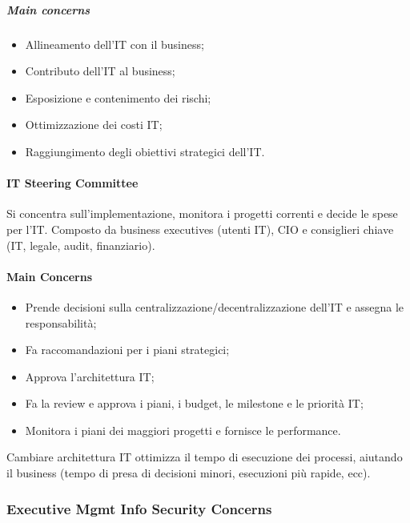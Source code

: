 \subparagraph*{Main concerns}

\begin{itemize}
\item Allineamento dell'IT con il business;
\item Contributo dell'IT al business;
\item Esposizione e contenimento dei rischi;
\item Ottimizzazione dei costi IT;
\item Raggiungimento degli obiettivi strategici dell'IT.
\end{itemize}

\paragraph{IT Steering Committee}

Si concentra sull'implementazione, monitora i progetti correnti e decide le 
spese per l'IT. Composto da business executives (utenti IT), CIO e consiglieri 
chiave (IT, legale, audit, finanziario).

\paragraph*{Main Concerns}

\begin{itemize}
\item Prende decisioni sulla centralizzazione/decentralizzazione dell'IT e
assegna le responsabilità;
\item Fa raccomandazioni per i piani strategici;
\item Approva l'architettura IT;
\item Fa la review e approva i piani, i budget, le milestone e le priorità IT;
\item Monitora i piani dei maggiori progetti e fornisce le performance.
\end{itemize}

Cambiare architettura IT ottimizza il tempo di esecuzione dei processi, aiutando 
il business (tempo di presa di decisioni minori, esecuzioni più rapide, ecc).

\subsubsection{Executive Mgmt Info Security Concerns}

